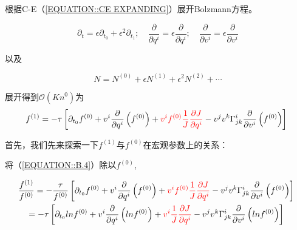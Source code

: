 \documentclass[LBMDerivation.tex]{subfiles}
\begin{document}
根据C-E（\ref{EQUATION::CE EXPANDING}）展开Bolzmann方程。

%
%
$$
  \partial_{t}=\epsilon \partial_{t_{0}}+\epsilon^{2} \partial_{t_{1}} ; \quad \frac{\partial}{\partial q^{i}}=\epsilon \frac{\partial}{\partial q^{i}} ; \quad \frac{\partial}{\partial v^{i}}=\epsilon \frac{\partial}{\partial v^{i}}
$$

以及

$$
  N=N^{(0)}+\epsilon N^{(1)}+\epsilon^{2} N^{(2)}+\cdots
$$
%

展开得到$\mathcal{O}\left(K n^{0}\right)$为
\begin{equation}
  f^{(1)}=-\tau\left[\partial_{t_{0}} f^{(0)}+v^{i} \frac{\partial}{\partial q^{i}}\left(f^{(0)}\right) + {\color{red} v^if^{(0)} \frac{1}{J} \frac{\partial J}{\partial q^i}} -v^{j} v^{k}\Gamma_{j k}^{i}\frac{\partial}{\partial v^{i}}\left(  f^{(0)}\right)\right]
  \label{EQUATION::B.4} ~
\end{equation}
%




首先，我们先来探索一下$f^{(1)}$与$f^{(0)}$在宏观参数上的关系：

将（\ref{EQUATION::B.4}）除以$f^{(0)}$,


\begin{equation}
  \begin{gathered}
    \frac{f^{(1)}}{f^{(0)}}=-\frac{\tau}{f^{(0)}}\left[\partial_{t_{0}} f^{(0)}+v^{i}\frac{\partial}{\partial q^{i}}\left( f^{(0)}\right)+ {\color{red} v^i f^{(0)}\frac{1}{J} \frac{\partial J}{\partial q^i}}-v^{j} v^{k} \Gamma_{j k}^{i} \frac{\partial}{\partial v^{i}}\left(  f^{(0)}\right)\right] \\
    = -\tau \left[\partial_{t_{0}} ln f^{(0)}+v^{i}\frac{\partial}{\partial q^{i}}\left( ln f^{(0)}\right)+ {\color{red} v^i \frac{1}{J} \frac{\partial J}{\partial q^i}} -v^{j} v^{k} \Gamma_{j k}^{i} \frac{\partial}{\partial v^{i}}\left(  ln f^{(0)}\right)\right]
  \end{gathered}
  \label{EQUATION::Kn的关系} ~
\end{equation}
\end{document}

